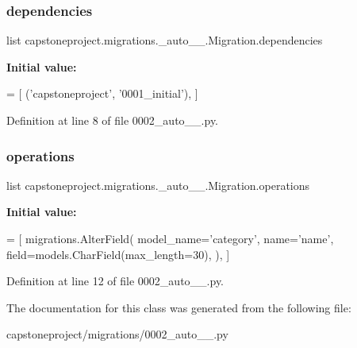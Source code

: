 \subsubsection{\texorpdfstring{dependencies}{dependencies}}
{\footnotesize\ttfamily list capstoneproject.\+migrations.\+\_\+auto\+\_\+\_.\+Migration.\+dependencies\hspace{0.3cm}{\ttfamily [static]}}

{\bfseries Initial value\+:}
\begin{DoxyCode}
=  [
        (\textcolor{stringliteral}{'capstoneproject'}, \textcolor{stringliteral}{'0001\_initial'}),
    ]
\end{DoxyCode}


Definition at line 8 of file 0002\+\_\+auto\+\_\+\_.\+py.

\mbox{\label{classcapstoneproject_1_1migrations_1_10002__auto__20180411__1759_1_1_migration_a9e8f250158f3e39813041d559dad70b8}} 
\subsubsection{\texorpdfstring{operations}{operations}}
{\footnotesize\ttfamily list capstoneproject.\+migrations.\+\_\+auto\+\_\+\_.\+Migration.\+operations\hspace{0.3cm}{\ttfamily [static]}}

{\bfseries Initial value\+:}
\begin{DoxyCode}
=  [
        migrations.AlterField(
            model\_name=\textcolor{stringliteral}{'category'},
            name=\textcolor{stringliteral}{'name'},
            field=models.CharField(max\_length=30),
        ),
    ]
\end{DoxyCode}


Definition at line 12 of file 0002\+\_\+auto\+\_\+\_.\+py.



The documentation for this class was generated from the following file\+:\begin{DoxyCompactItemize}
\item 
capstoneproject/migrations/0002\+\_\+auto\+\_\+\_.\+py\end{DoxyCompactItemize}
